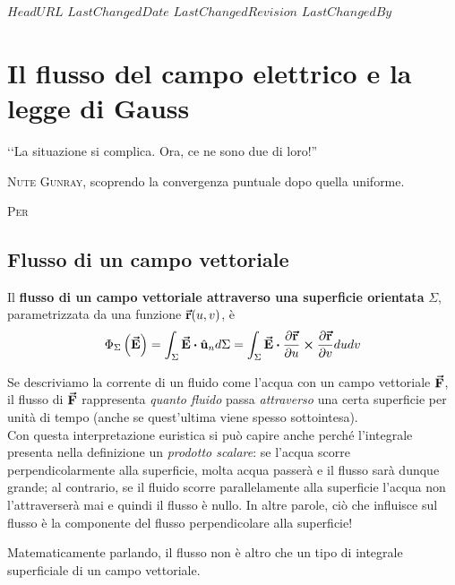 \svnidlong
{$HeadURL$}
{$LastChangedDate$}
{$LastChangedRevision$}
{$LastChangedBy$}

\chapter{Il flusso del campo elettrico e la legge di Gauss}

\begin{introduction}
	‘‘La situazione si complica. Ora, ce ne sono due di loro!''
	\begin{flushright}
		\textsc{Nute Gunray,} scoprendo la convergenza puntuale dopo quella uniforme. %
	\end{flushright}
\end{introduction}
\lettrine[findent=1pt, nindent=0pt]{P}{er}  %
\section{Flusso di un campo vettoriale}
\begin{define}
	Il \textbf{flusso di un campo vettoriale attraverso una superficie orientata} $\Sigma$, parametrizzata da una funzione $\vb*{\va{r}}(u,v)$, è
	\begin{equation}
		\Phi_{\Sigma}\left(\vba{E}\right)=\int_{\Sigma}\vba{E}\vdot\vbh{u}_nd\Sigma=\int_{\Sigma}\vba{E}\vdot\frac{\partial \vba{r}}{\partial u}\cross\frac{\partial \vba{r}}{\partial v}dudv
	\end{equation}
\end{define}
\begin{intuit}
	Se descriviamo la corrente di un fluido come l'acqua con un campo vettoriale $\vb*{\va{F}}$, il flusso di $\vb*{\va{F}}$ rappresenta \textit{quanto fluido} passa \textit{attraverso} una certa superficie per unità di tempo (anche se quest'ultima viene spesso sottointesa).\\
	Con questa interpretazione euristica si può capire anche perché l'integrale presenta nella definizione un \textit{prodotto scalare}: se l'acqua scorre perpendicolarmente alla superficie, molta acqua passerà e il flusso sarà dunque grande; al contrario, se il fluido scorre parallelamente alla superficie l'acqua non l'attraverserà mai e quindi il flusso è nullo. In altre parole, ciò che influisce sul flusso è la componente del flusso perpendicolare alla superficie!
\end{intuit}
Matematicamente parlando, il flusso non è altro che un tipo di integrale superficiale di un campo vettoriale. %

